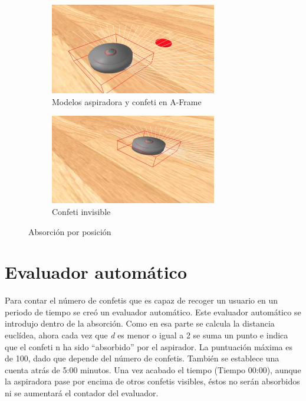 \begin{figure}[H]
  \begin{subfigure}[b]{0.5\textwidth}
  \centering
    \includegraphics[width=0.8\textwidth, height=0.5\textwidth]{chapters/images/prototiporoomba.png}
    \caption{Modelos aspiradora y confeti en A-Frame}
    \label{fig:f1}
  \end{subfigure}
  \hfill
  \begin{subfigure}[b]{0.5\textwidth}
  \centering
    \includegraphics[width=0.8\textwidth, height=0.5\textwidth]{chapters/images/prototiporoomba2.png}
	\caption{Confeti invisible}    
    \label{fig:f2}
 
  \end{subfigure}
  \caption{Absorción por posición}
\end{figure}


\section{Evaluador automático}
Para contar el número de confetis que es capaz de recoger un usuario en un periodo de tiempo se creó un evaluador automático. Este evaluador automático se introdujo dentro de la absorción. Como en esa parte se calcula la distancia euclídea, ahora cada vez que \textit{d} es menor o igual a 2 se suma un punto e indica que el confeti n ha sido  ``absorbido'' por el aspirador. La puntuación máxima es de 100, dado que depende del número de confetis. También se establece una cuenta atrás de 5:00 minutos. Una vez acabado el tiempo (Tiempo 00:00), aunque la aspiradora pase por encima de otros confetis visibles, éstos no serán absorbidos ni se aumentará el contador del evaluador. 

